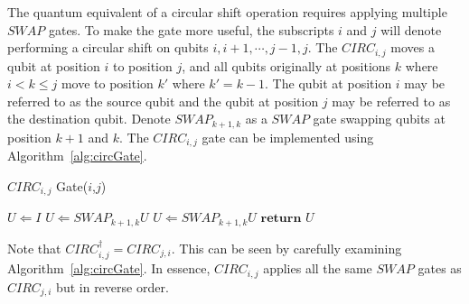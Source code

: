 The quantum equivalent of a circular shift operation requires applying multiple $\mathit{SWAP}$ gates. To make the gate more useful, the subscripts $i$ and $j$ will denote performing a circular shift on qubits $i, i+1, \cdots ,j-1, j$. The $\mathit{CIRC}_{i,j}$ moves a qubit at position $i$ to position $j$, and all qubits originally at positions $k$ where $i < k \leq j$ move to position $k'$ where $k' = k - 1$. The qubit at position $i$ may be referred to as the source qubit and the qubit at position $j$ may be referred to as the destination qubit. Denote $\mathit{SWAP}_{k+1,k}$ as a $\mathit{SWAP}$ gate swapping qubits at position $k+1$ and $k$. The $\mathit{CIRC}_{i,j}$ gate can be implemented using Algorithm~\ref{alg:circGate}.
\begin{algorithm}[H]
  \caption{$\mathit{CIRC}_{i,j}$ Gate($i$,$j$)}  \label{alg:circGate}
  \begin{algorithmic}[1]
  \State $U \Longleftarrow I$
    \State $U \Longleftarrow \mathit{SWAP}_{k+1,k}U$
  \EndFor
  \Else
    \State $U \Longleftarrow \mathit{SWAP}_{k+1,k}U$
  \EndFor
  \EndIf
  \State $\mathbf{return}$ $U$
  \end{algorithmic}
\end{algorithm}
Note that $\mathit{CIRC}_{i,j}^{\dagger} = \mathit{CIRC}_{j,i}$. This can be seen by carefully examining Algorithm~\ref{alg:circGate}. In essence, $\mathit{CIRC}_{i,j}$ applies all the same $\mathit{SWAP}$ gates as $\mathit{CIRC}_{j,i}$ but in reverse order.

